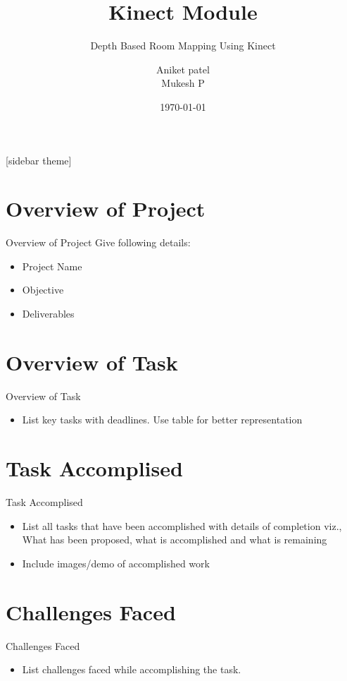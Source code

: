\documentclass[10pt, a4paper]{beamer}
\begin{document}
	\title{Kinect Module}
	\subtitle{Depth Based Room Mapping Using Kinect}
	\author{Aniket patel\\Mukesh P}
	\date{\today}
	\frame{\titlepage}

[sidebar theme]
\section{Overview of Project}
\begin{frame}{Overview of Project}
	Give following details: \\
	\begin{itemize}
		\item Project Name
		\item Objective
		\item Deliverables
	\end{itemize}
\end{frame}

\section{Overview of Task}
\begin{frame}{Overview of Task}
	\begin{itemize}
		\item List key tasks with deadlines. Use table for better representation
	\end{itemize}
\end{frame}

\section{Task Accomplised}
\begin{frame}{Task Accomplised}
	\begin{itemize}
		\item List all tasks that have been accomplished with details of completion viz., What has been proposed, what is accomplished and what is remaining  
		\item Include images/demo of accomplished work
	\end{itemize}
\end{frame}

\section{Challenges Faced}
\begin{frame}{Challenges Faced}
	\begin{itemize}
		\item List challenges faced while accomplishing the task.  
	\end{itemize}
\end{frame}
\end{document}
